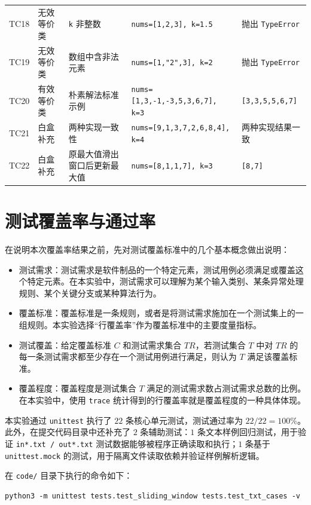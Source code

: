 \documentclass[a4paper,UTF8,fontset=none]{ctexart}
\begin{document}
\begin{longtable}{>{\raggedright\arraybackslash}p{1.2cm} >{\raggedright\arraybackslash}p{2.3cm} >{\raggedright\arraybackslash}p{2.7cm} >{\raggedright\arraybackslash}p{4.7cm} >{\raggedright\arraybackslash}p{2.7cm}}
TC18 & 无效等价类 & \texttt{k} 非整数 & \texttt{nums=[1,2,3], k=1.5} & 抛出 \texttt{TypeError} \\
TC19 & 无效等价类 & 数组中含非法元素 & \texttt{nums=[1,"2",3], k=2} & 抛出 \texttt{TypeError} \\
TC20 & 有效等价类 & 朴素解法标准示例 & \texttt{nums=[1,3,-1,-3,5,3,6,7], k=3} & \texttt{[3,3,5,5,6,7]} \\
TC21 & 白盒补充 & 两种实现一致性 & \texttt{nums=[9,1,3,7,2,6,8,4], k=4} & 两种实现结果一致 \\
TC22 & 白盒补充 & 原最大值滑出窗口后更新最大值 & \texttt{nums=[8,1,1,7], k=3} & \texttt{[8,7]} \\
\bottomrule
\end{longtable}

\section{测试覆盖率与通过率}

在说明本次覆盖率结果之前，先对测试覆盖标准中的几个基本概念做出说明：

\begin{itemize}
    \item 测试需求：测试需求是软件制品的一个特定元素，测试用例必须满足或覆盖这个特定元素。在本实验中，测试需求可以理解为某个输入类别、某条异常处理规则、某个关键分支或某种算法行为。
    \item 覆盖标准：覆盖标准是一条规则，或者是将测试需求施加在一个测试集上的一组规则。本实验选择“行覆盖率”作为覆盖标准中的主要度量指标。
    \item 测试覆盖：给定覆盖标准 $C$ 和测试需求集合 $TR$，若测试集合 $T$ 中对 $TR$ 的每一条测试需求都至少存在一个测试用例进行满足，则认为 $T$ 满足该覆盖标准。
    \item 覆盖程度：覆盖程度是测试集合 $T$ 满足的测试需求数占测试需求总数的比例。在本实验中，使用 \texttt{trace} 统计得到的行覆盖率就是覆盖程度的一种具体体现。
\end{itemize}

本实验通过 \texttt{unittest} 执行了 $22$ 条核心单元测试，测试通过率为 $22/22=100\%$。此外，在提交代码目录中还补充了 $2$ 条辅助测试：$1$ 条文本样例回归测试，用于验证 \texttt{in*.txt / out*.txt} 测试数据能够被程序正确读取和执行；$1$ 条基于 \texttt{unittest.mock} 的测试，用于隔离文件读取依赖并验证样例解析逻辑。

在 \texttt{code/} 目录下执行的命令如下：

\begin{lstlisting}
python3 -m unittest tests.test_sliding_window tests.test_txt_cases -v
\end{lstlisting}
\end{document}
